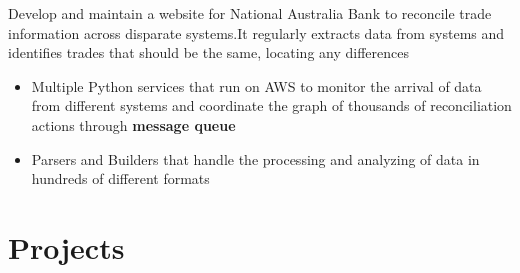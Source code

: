 \documentclass{resume}
\begin{document}
\begin{flushleft}
Develop and maintain a website for National Australia Bank to reconcile trade information across disparate systems.\linebreak It regularly extracts data from systems and identifies trades that should be the same, locating any differences
\begin{itemize}
  \item Multiple Python services that run on AWS to monitor the arrival of data from different systems and \linebreak coordinate the graph of thousands of reconciliation actions through \textbf{message queue}
  \item Parsers and Builders that handle the processing and analyzing of data in hundreds of different formats
\end{itemize}
\end{flushleft}

\section{Projects}
\end{document}
